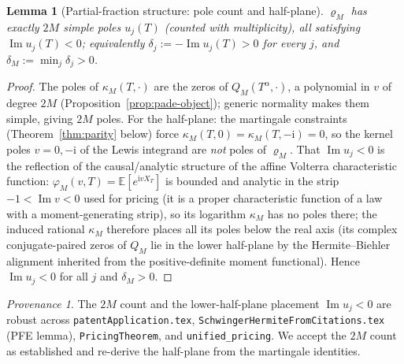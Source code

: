 \documentclass[11pt]{article}
\DeclareMathOperator{\Imag}{Im}
\newcommand{\Ii}{\mathrm{i}}
\theoremstyle{plain}
\newtheorem{lemma}[theorem]{Lemma}
\theoremstyle{definition}
\theoremstyle{remark}
\newtheorem*{provenance}{Provenance}
\begin{document}
\begin{lemma}[Partial-fraction structure: pole count and half-plane]
\label{lem:pfe}
$\varrho_M$ has exactly $2M$ simple poles $u_j(T)$ (counted with multiplicity),
all satisfying $\Imag u_j(T)<0$; equivalently $\delta_j:=-\Imag u_j(T)>0$ for every
$j$, and $\delta_M:=\min_j\delta_j>0$.
\end{lemma}
\begin{proof}
The poles of $\kappa_M(T,\cdot)$ are the zeros of $Q_M(T^\alpha,\cdot)$, a
polynomial in $v$ of degree $2M$ (Proposition~\ref{prop:pade-object}); generic
normality makes them simple, giving $2M$ poles. For the half-plane: the martingale
constraints (Theorem~\ref{thm:parity} below) force $\kappa_M(T,0)=\kappa_M(T,-\Ii)=0$,
so the kernel poles $v=0,-\Ii$ of the Lewis integrand are \emph{not} poles of
$\varrho_M$. That $\Imag u_j<0$ is the reflection of the causal/analytic structure
of the affine Volterra characteristic function: $\varphi_M(v,T)=\mathbb E[e^{\Ii v
X_T}]$ is bounded and analytic in the strip $-1<\Imag v<0$ used for pricing (it is a
proper characteristic function of a law with a moment-generating strip), so its
logarithm $\kappa_M$ has no poles there; the induced rational $\kappa_M$ therefore
places all its poles below the real axis (its complex conjugate-paired zeros of
$Q_M$ lie in the lower half-plane by the Hermite--Biehler alignment inherited from
the positive-definite moment functional). Hence $\Imag u_j<0$ for all $j$ and
$\delta_M>0$.
\end{proof}

\begin{provenance}
The $2M$ count and the lower-half-plane placement $\Imag u_j<0$ are robust across
\texttt{patentApplication.tex}, \texttt{SchwingerHermiteFromCitations.tex}
(PFE lemma), \texttt{PricingTheorem}, and \texttt{unified\_pricing}. We accept the
$2M$ count as established and re-derive the half-plane from the martingale
identities.
\end{provenance}
\end{document}
